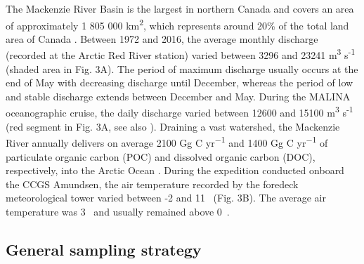 \documentclass[essd, manuscript]{copernicus}
\begin{document}
The Mackenzie River Basin is the largest in northern Canada and covers an area of approximately 1 805 000 km\textsuperscript{2}, which represents around 20\% of the total land area of Canada \citep{AbdulAziz2006}. Between 1972 and 2016, the average monthly discharge (recorded at the Arctic Red River station) varied between 3296 and 23241 m\textsuperscript{3} s\textsuperscript{-1} (shaded area in Fig. 3A). The period of maximum discharge usually occurs at the end of May with decreasing discharge until December, whereas the period of low and stable discharge extends between December and May. During the MALINA oceanographic cruise, the daily discharge varied between 12600 and 15100 m\textsuperscript{3} s\textsuperscript{-1} (red segment in Fig. 3A, see also \citet{Ehn2019}). Draining a vast watershed, the Mackenzie River annually delivers on average 2100 Gg C yr\textsuperscript{−1} and 1400 Gg C yr\textsuperscript{−1} of particulate organic carbon (POC) and dissolved organic carbon (DOC), respectively,  into the Arctic Ocean \citep{Stein2004, Raymond2007}. During the expedition conducted onboard the CCGS Amundsen, the air temperature recorded by the foredeck meteorological tower varied between -2 and 11~\textcelsius{} (Fig. 3B). The average air temperature was  3~\textcelsius{} and usually remained above 0~\textcelsius{}.

\subsection{General sampling strategy}
\end{document}
